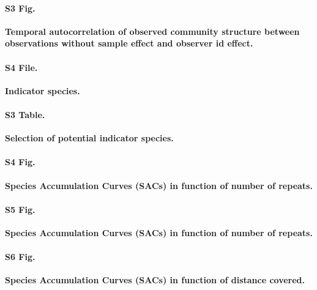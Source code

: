 \documentclass[10pt,letterpaper]{article}
\begin{document}
\paragraph*{S3 Fig.}
\label{fig:plotpmgram2}
{\bf Temporal autocorrelation of observed community structure between observations without sample effect and observer id effect.}


\paragraph*{S4 File.}
\label{indicatorspecies2}
{\bf Indicator species.}

\paragraph*{S3 Table.}
\label{indicatorspecies2table}
{\bf Selection of potential indicator species.}


\paragraph*{S4 Fig.}
\label{fig:SR_permutation}
{\bf Species Accumulation Curves (SACs) in function of number of repeats.}

\paragraph*{S5 Fig.}
\label{fig:SR_permutation_different_transect_lengths}
{\bf Species Accumulation Curves (SACs) in function of number of repeats.}

\paragraph*{S6 Fig.}
\label{fig:SR_and_H_ifo_distance}
{\bf Species Accumulation Curves (SACs) in function of distance covered.}

\end{document}
